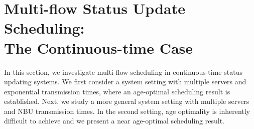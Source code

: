 \section{Multi-flow Status Update Scheduling: \\ The Continuous-time Case}\label{sec_analysis}
In this section, we investigate multi-flow scheduling in continuous-time status updating systems. We first consider a system setting with multiple servers and exponential transmission times, where an age-optimal scheduling result is established. Next, we study a more general system setting with multiple servers and NBU transmission times. In the second setting, age optimality is inherently difficult to achieve and we present a near age-optimal scheduling result. 






